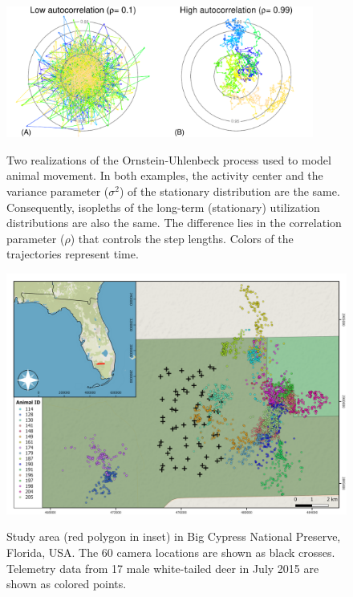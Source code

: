 \documentclass[12pt]{article}
\begin{document}
\clearpage

\begin{figure}[h!]
  \centering
  \includegraphics[width=0.9\textwidth]{figs/OU_low_high_contours} \\
  \caption{Two realizations of the Ornstein-Uhlenbeck process used to
    model animal movement. In both examples, the activity center and
    the variance parameter ($\sigma^2$) of the stationary distribution
    are the same. Consequently, isopleths of the long-term
    (stationary) utilization distributions are also the same. The
    difference lies in the correlation parameter ($\rho$) that
    controls the step lengths. Colors of the trajectories represent
    time.}   
  \label{fig:ou-concept}
\end{figure}


\clearpage


\begin{figure}[h!]
  \centering
  \includegraphics[width=\textwidth]{figs/StudyArea_6w_400dpi} \\
  \caption{Study area (red polygon in inset) in Big Cypress National Preserve, 
    Florida, USA. The 60 camera locations are shown as black
    crosses. Telemetry data from 17 male white-tailed deer in July
    2015 are shown as colored points.}
  \label{fig:study-area}
\end{figure}
\end{document}
